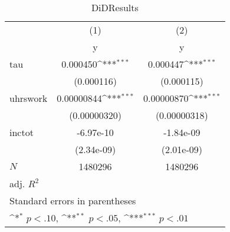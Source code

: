 \begin{table}[htbp]\centering
\def\sym#1{\ifmmode^{#1}\else\(^{#1}\)\fi}
\caption{DiDResults}
\begin{tabular}{l*{2}{c}}
\hline\hline
            &\multicolumn{1}{c}{(1)}&\multicolumn{1}{c}{(2)}\\
            &\multicolumn{1}{c}{y}&\multicolumn{1}{c}{y}\\
\hline
tau         &    0.000450\sym{***}&    0.000447\sym{***}\\
            &  (0.000116)         &  (0.000115)         \\
[1em]
uhrswork    &  0.00000844\sym{***}&  0.00000870\sym{***}\\
            &(0.00000320)         &(0.00000318)         \\
[1em]
inctot      &   -6.97e-10         &   -1.84e-09         \\
            &  (2.34e-09)         &  (2.01e-09)         \\
\hline
\(N\)       &     1480296         &     1480296         \\
adj. \(R^{2}\)&                     &                     \\
\hline\hline
\multicolumn{3}{l}{\footnotesize Standard errors in parentheses}\\
\multicolumn{3}{l}{\footnotesize \sym{*} \(p<.10\), \sym{**} \(p<.05\), \sym{***} \(p<.01\)}\\
\end{tabular}
\end{table}
